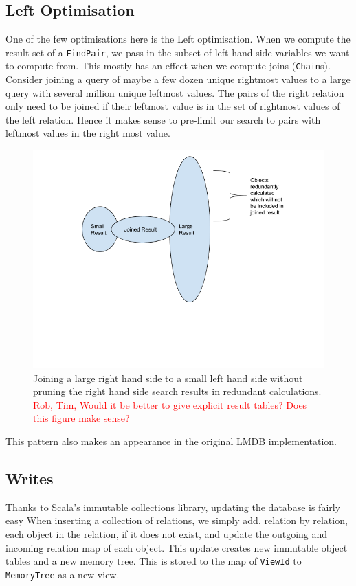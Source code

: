\documentclass[12pt,a4paper,twoside,openright]{report}
\newcommand\todo[1]{\textcolor{red}{#1}}
\newcommand\codeName[1]{\texttt{#1}}
\begin{document}
	\subsection{Left Optimisation}
	One of the few optimisations here is the Left optimisation. When we compute the result set of a \codeName{FindPair}, we pass in the subset of left hand side variables we want to compute from. This mostly has an effect when we compute joins (\codeName{Chain}s). Consider joining a query of maybe a few dozen unique rightmost values to a large query with several million unique leftmost values. The pairs of the right relation only need to be joined if their leftmost value is in the set of rightmost values of the left relation. Hence it makes sense to pre-limit our search to pairs with leftmost values in the right most value. 
\begin{figure}[ht]
	\centering
	\includegraphics[width=\textwidth]{figs/LeftHandOptimisation.png}
	\caption{Joining a large right hand side to a small left hand side without pruning the right hand side search results in redundant calculations. \todo{Rob, Tim, Would it be better to give explicit result tables? Does this figure make sense?}}
	\label{fig:LeftHandOptimisation}
\end{figure}
This pattern also makes an appearance in the original LMDB implementation.
	\subsection{Writes}
	Thanks to Scala's immutable collections library, updating the database is fairly easy When inserting a collection of relations, we simply add, relation by relation, each object in the relation, if it does not exist, and update the outgoing and incoming relation map of each object. This update creates new immutable object tables and a new memory tree. This is stored to the map of \codeName{ViewId}  to \codeName{MemoryTree} as a new view.
\end{document}
